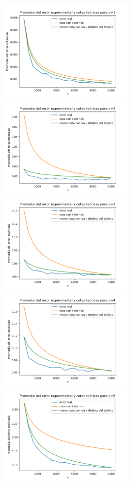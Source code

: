 \documentclass[12pt, a4paper]{article}
\begin{document}
\includegraphics[width=0.5\textwidth]{figuras_h_semidinamico/cotas-error-d=1}
\includegraphics[width=0.5\textwidth]{figuras_h_semidinamico/cotas-error-d=2}
\includegraphics[width=0.5\textwidth]{figuras_h_semidinamico/cotas-error-d=3}
\includegraphics[width=0.5\textwidth]{figuras_h_semidinamico/cotas-error-d=4}
\includegraphics[width=0.5\textwidth]{figuras_h_semidinamico/cotas-error-d=6}
\end{document}
